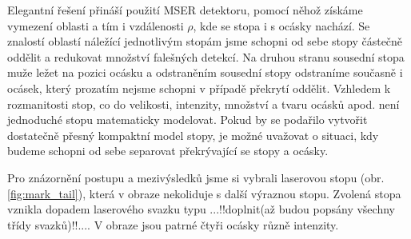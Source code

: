 	Elegantní řešení přináší použití MSER detektoru, pomocí něhož získáme vymezení oblasti a tím i vzdálenosti $\rho$, kde se stopa i s ocásky nachází. Se znalostí oblastí náležící jednotlivým stopám jsme schopni od sebe stopy částečně oddělit a redukovat množství falešných detekcí. Na druhou stranu sousední stopa muže ležet na pozici ocásku a odstraněním sousední stopy odstraníme současně i ocásek, který prozatím nejsme schopni v případě překrytí oddělit. Vzhledem k rozmanitosti stop, co do velikosti, intenzity, množství a tvaru ocásků apod. není jednoduché stopu matematicky modelovat. Pokud by se podařilo vytvořit dostatečně přesný kompaktní model stopy, je možné uvažovat o situaci, kdy budeme schopni od sebe separovat překrývající se stopy a ocásky. 
	
 Pro znázornění postupu a mezivýsledků jsme si vybrali laserovou stopu (obr.\ref{fig:mark_tail}), která v obraze nekoliduje s další výraznou stopu. Zvolená stopa vznikla dopadem laserového svazku typu ...!!doplnit(až budou popsány všechny třídy svazků)!!.... V obraze jsou patrné čtyři ocásky různě intenzity. 
	


